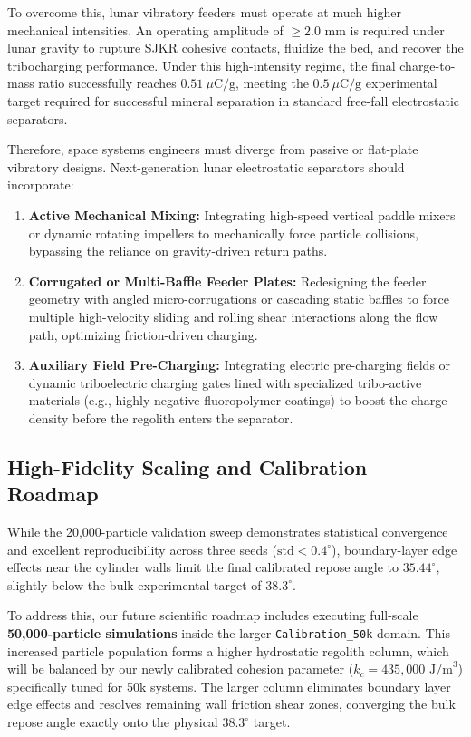 \documentclass[preprint,12pt,authoryear]{elsarticle}
\begin{document}
To overcome this, lunar vibratory feeders must operate at much higher mechanical intensities. An operating amplitude of \textbf{$\ge 2.0\text{ mm}$} is required under lunar gravity to rupture SJKR cohesive contacts, fluidize the bed, and recover the tribocharging performance. Under this high-intensity regime, the final charge-to-mass ratio successfully reaches \textbf{$0.51\ \mu\text{C/g}$}, meeting the $0.5\ \mu\text{C/g}$ experimental target required for successful mineral separation in standard free-fall electrostatic separators.
 

Therefore, space systems engineers must diverge from passive or flat-plate vibratory designs. Next-generation lunar electrostatic separators should incorporate:
\begin{enumerate}
    \item \textbf{Active Mechanical Mixing:} Integrating high-speed vertical paddle mixers or dynamic rotating impellers to mechanically force particle collisions, bypassing the reliance on gravity-driven return paths.
    \item \textbf{Corrugated or Multi-Baffle Feeder Plates:} Redesigning the feeder geometry with angled micro-corrugations or cascading static baffles to force multiple high-velocity sliding and rolling shear interactions along the flow path, optimizing friction-driven charging.
    \item \textbf{Auxiliary Field Pre-Charging:} Integrating electric pre-charging fields or dynamic triboelectric charging gates lined with specialized tribo-active materials (e.g., highly negative fluoropolymer coatings) to boost the charge density before the regolith enters the separator.
\end{enumerate}

\subsection{High-Fidelity Scaling and Calibration Roadmap}
While the 20,000-particle validation sweep demonstrates statistical convergence and excellent reproducibility across three seeds ($\text{std} < 0.4^\circ$), boundary-layer edge effects near the cylinder walls limit the final calibrated repose angle to $35.44^\circ$, slightly below the bulk experimental target of $38.3^\circ$. 

To address this, our future scientific roadmap includes executing full-scale \textbf{50,000-particle simulations} inside the larger \texttt{Calibration\_50k} domain. This increased particle population forms a higher hydrostatic regolith column, which will be balanced by our newly calibrated cohesion parameter ($k_c = 435,000\text{ J/m}^3$) specifically tuned for 50k systems. The larger column eliminates boundary layer edge effects and resolves remaining wall friction shear zones, converging the bulk repose angle exactly onto the physical $38.3^\circ$ target.
\end{document}
